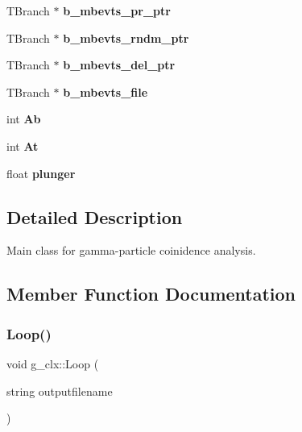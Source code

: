 \begin{DoxyCompactItemize}
T\+Branch $\ast$ {\bfseries b\+\_\+mbevts\+\_\+pr\+\_\+ptr}
\item 
\mbox{\label{classg__clx_a7401209db4725c74c75d38e15a6b2d11}} 
T\+Branch $\ast$ {\bfseries b\+\_\+mbevts\+\_\+rndm\+\_\+ptr}
\item 
\mbox{\label{classg__clx_abb8b9787037a50733cc8f2efb64fadba}} 
T\+Branch $\ast$ {\bfseries b\+\_\+mbevts\+\_\+del\+\_\+ptr}
\item 
\mbox{\label{classg__clx_a59f6b47f4c944b311e6dd5a0abb103c5}} 
T\+Branch $\ast$ {\bfseries b\+\_\+mbevts\+\_\+file}
\item 
\mbox{\label{classg__clx_a3ecad3ddd660369644dafb28e0bfe26d}} 
int {\bfseries Ab}
\item 
\mbox{\label{classg__clx_a357526f9a06f3059124825bbf6c7a790}} 
int {\bfseries At}
\item 
\mbox{\label{classg__clx_aee52e53d2cd780936d648225402d8bcf}} 
float {\bfseries plunger}
\end{DoxyCompactItemize}


\subsection{Detailed Description}
Main class for gamma-\/particle coinidence analysis. 

\subsection{Member Function Documentation}
\mbox{\label{classg__clx_a9d5de859df4bfbb746726661ff1d24a9}} 
\subsubsection{\texorpdfstring{Loop()}{Loop()}}
{\footnotesize\ttfamily void g\+\_\+clx\+::\+Loop (\begin{DoxyParamCaption}\item[{string}]{outputfilename }\end{DoxyParamCaption})\hspace{0.3cm}{\ttfamily [virtual]}}

